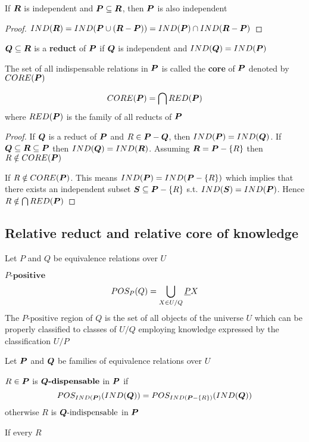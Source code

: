 \documentclass[11pt]{article}
\begin{document}
\begin{proposition}[3.1]
If \(\boldsymbol{R}\) is independent and \(\boldsymbol{P}\subseteq \boldsymbol{R}\), then \(\boldsymbol{P}\) is also independent
\end{proposition}

\begin{proof}
\(IND(\boldsymbol{R})=IND(\boldsymbol{P}\cup(\boldsymbol{R}-\boldsymbol{P}))=IND(\boldsymbol{P})\cap IND(\boldsymbol{R}-\boldsymbol{P})\)
\end{proof}

\(\boldsymbol{Q}\subseteq \boldsymbol{R}\) is a \textbf{reduct} of \(\boldsymbol{P}\) if \(\boldsymbol{Q}\) is independent and
\(IND(\boldsymbol{Q})=IND(\boldsymbol{P})\)


The set of all indispensable relations in \(\boldsymbol{P}\) is called the \textbf{core} of \(\boldsymbol{P}\)
denoted by \(CORE(\boldsymbol{P})\)

\begin{proposition}[3.2]
\begin{equation*}
CORE(\boldsymbol{P})=\bigcap RED(\boldsymbol{P})
\end{equation*}
where \(RED(\boldsymbol{P})\) is the family of all reducts of \(\boldsymbol{P}\)
\end{proposition}

\begin{proof}
If \(\boldsymbol{Q}\) is a reduct of \(\boldsymbol{P}\) and \(R\in\boldsymbol{P}-\boldsymbol{Q}\), then \(IND(\boldsymbol{P})=IND(\boldsymbol{Q})\). If
\(\boldsymbol{Q}\subseteq\boldsymbol{R}\subseteq\boldsymbol{P}\) then \(IND(\boldsymbol{Q})=IND(\boldsymbol{R})\). Assuming \(\boldsymbol{R}=\boldsymbol{P}-\left\{
   R\right\}\) then \(R\notin CORE(\boldsymbol{P})\)

If \(R\notin CORE(\boldsymbol{P})\). This means \(IND(\boldsymbol{P})=IND(\boldsymbol{P}-\left\{ R\right\})\) which implies
that there exists an independent subset \(\boldsymbol{S}\subseteq \boldsymbol{P}-\left\{ R\right\}\) s.t.
\(IND(\boldsymbol{S})=IND(\boldsymbol{P})\). Hence \(R\notin\bigcap RED(\boldsymbol{P})\)
\end{proof}
\subsection{Relative reduct and relative core of knowledge}
\label{sec:org81e75da}
Let \(P\) and \(Q\) be equivalence relations over \(U\)

\(P\textbf{-positive}\)
\begin{equation*}
POS_P(Q)=\displaystyle\bigcup_{X\in U/Q}\underline{P} X
\end{equation*}
The \(P\text{-positive}\) region of \(Q\) is the set of all objects of the
universe \(U\) which can be properly classified to classes of \(U/Q\) employing
knowledge expressed by the classification \(U/P\)


Let \(\boldsymbol{P}\) and \(\boldsymbol{Q}\) be families of equivalence relations over \(U\)

\(R\in\boldsymbol{P}\) is \(\boldsymbol{Q}\textbf{-dispensable}\) in \(\boldsymbol{P}\) if
\begin{equation*}
POS_{IND(\boldsymbol{P})}(IND(\boldsymbol{Q}))=POS_{IND(\boldsymbol{P}-\left\{ R\right\})}(IND(\boldsymbol{Q}))
\end{equation*}
otherwise \(R\) is \(\boldsymbol{Q}\text{-indispensable}\) in \(\boldsymbol{P}\)

If every \(R\) 
\end{document}
